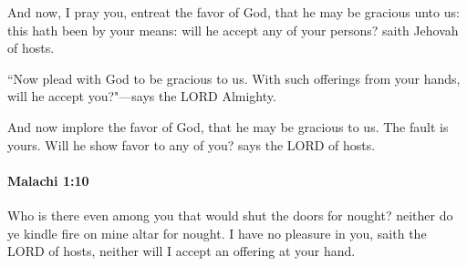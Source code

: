 			\begin{versebox}
					\item[BHS] 
					\item[LXX] 
					\item[ASV] And now, I pray you, entreat the favor of God, that he may be gracious unto us: this hath been by your means: will he accept any of your persons? saith Jehovah of hosts.
					\item[NIV] “Now plead with God to be gracious to us. With such offerings from your hands, will he accept you?"—says the LORD Almighty.
					\item[NRSV] And now implore the favor of God, that he may be gracious to us. The fault is yours. Will he show favor to any of you? says the LORD of hosts.
			\end{versebox}

		\paragraph{Malachi 1:10} %
			\label{MALACHI-1-10}

			Who is there even among you that would shut the doors for nought? neither do ye kindle fire on mine altar for nought. I have no pleasure in you, saith the LORD of hosts, neither will I accept an offering at your hand.


